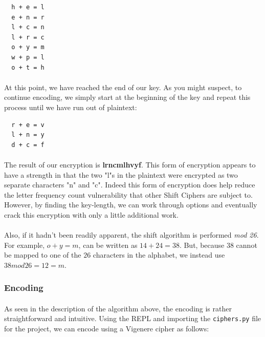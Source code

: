 \documentclass[12pt,a4paper]{article}
\begin{document}
\begin{verbatim}
  h + e = l
  e + n = r
  l + c = n
  l + r = c
  o + y = m
  w + p = l
  o + t = h 
\end{verbatim}

\paragraph{}
At this point, we have reached the end of our key.  As you might suspect, to 
continue encoding, we simply start at the beginning of the key and repeat this 
process until we have run out of plaintext:

\begin{verbatim}
  r + e = v
  l + n = y
  d + c = f
\end{verbatim}

\paragraph{}
The result of our encryption is \textbf{lrncmlhvyf}.  This form of encryption 
appears to have a strength in that the two "l"s in the plaintext were 
encrypted as two separate characters "n" and "c".  Indeed this form of 
encryption does help reduce the letter frequency count vulnerability that other 
Shift Ciphers are subject to.  However, by finding the key-length, we can work 
through options and eventually crack this encryption with only a little 
additional work.

\paragraph{}
Also, if it hadn't been readily apparent, the shift algorithm is performed 
\textit{mod 26}.  For example, $o + y = m$, can be written as 
$14 + 24 = 38$.  But, because $38$ cannot be mapped to one of the $26$ 
characters in the alphabet, we instead use $38 mod 26 = 12 = m$.

\subsubsection{Encoding}
\paragraph{}
As seen in the description of the algorithm above, the encoding is rather 
straightforward and intuitive.  Using the REPL and importing the 
\verb|ciphers.py| file for the project, we can encode using a Vigenere 
cipher as follows:
\end{document}
